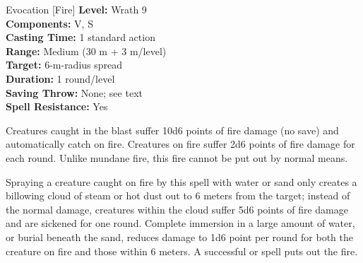 {Evocation [Fire]}
{
	\textbf{Level:}
	Wrath 9\\
	\textbf{Components:}
	V, S\\
	\textbf{Casting Time:}
	1 standard action\\
	\textbf{Range:}
	Medium (30 m + 3 m/level)\\
	\textbf{Target:}
	6-m-radius spread\\
	\textbf{Duration:}
	1 round/level\\
	\textbf{Saving Throw:}
	None; see text\\
	\textbf{Spell Resistance:}
	Yes\\
}
{
	Creatures caught in the blast suffer 10d6 points of fire damage (no save) and automatically catch on fire. Creatures on fire suffer 2d6 points of fire damage for each round. Unlike mundane fire, this fire cannot be put out by normal means.

	Spraying a creature caught on fire by this spell with water or sand only creates a billowing cloud of steam or hot dust out to 6 meters from the target; instead of the normal damage, creatures within the cloud suffer 5d6 points of fire damage and are sickened for one round. Complete immersion in a large amount of water, or burial beneath the sand, reduces damage to 1d6 point per round for both the creature on fire and those within 6 meters. A successful  or  spell puts out the fire.
}
